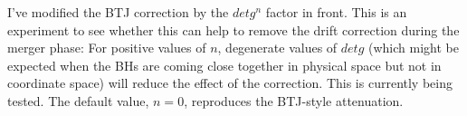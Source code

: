 I've modified the BTJ correction by the $detg^n$ factor in front.
This is an experiment to see whether this can help to remove the drift
correction during the merger phase: For positive values of $n$,
degenerate values of $detg$ (which might be expected when the BHs are
coming close together in physical space but not in coordinate space)
will reduce the effect of the correction.  This is currently being
tested. The default value, $n=0$, reproduces the BTJ-style
attenuation.



\begin{thebibliography}{9}

\end{thebibliography}



